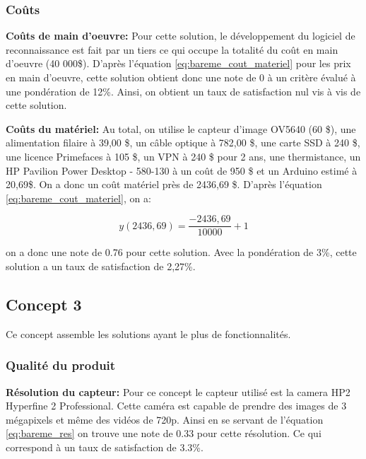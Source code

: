 \subsubsection{Coûts}

\textbf{Coûts de main d'oeuvre:}
Pour cette solution, le développement du logiciel de reconnaissance est fait par un tiers ce qui occupe la totalité du coût en main d'oeuvre (40 000\$). D'après l'équation \ref{eq:bareme_cout_materiel} pour les prix en main d'oeuvre, cette solution obtient donc une note de 0 à un critère évalué à une pondération de 12\%. Ainsi, on obtient un taux de satisfaction nul vis à vis de cette solution.
\vspace{5mm}

\textbf{Coûts du matériel:}
Au total, on utilise le capteur d'image OV5640 (60 \$), une alimentation filaire à 39,00 \$, un câble optique à 782,00 \$, une carte SSD à 240 \$, une licence Primefaces à 105 \$, un VPN à 240 \$ pour 2 ans, une thermistance, un HP Pavilion Power Desktop - 580-130 à un coût de 950 \$ et un Arduino estimé à 20,69\$. On a donc un coût matériel près de 2436,69 \$. D'après l'équation \ref{eq:bareme_cout_materiel}, on a:

\begin{equation}
y(2436,69) =  \frac{-2436,69}{10000} +1 \end{equation}

on a donc une note de 0.76 pour cette solution. Avec la pondération de 3\%, cette solution a un taux de satisfaction de 2,27\%.




\subsection{Concept 3}

Ce concept assemble les solutions ayant le plus de fonctionnalités.

\subsubsection{Qualité du produit}

\textbf{Résolution du capteur:} Pour ce concept le capteur utilisé est la camera HP2 Hyperfine 2 Professional. Cette caméra est capable de prendre des images de 3 mégapixels et même des vidéos de 720p. Ainsi en se servant de l’équation \ref{eq:bareme_res} on trouve une note de 0.33 pour cette résolution. Ce qui correspond à un taux de satisfaction de 3.3\%.
\vspace{5mm}


